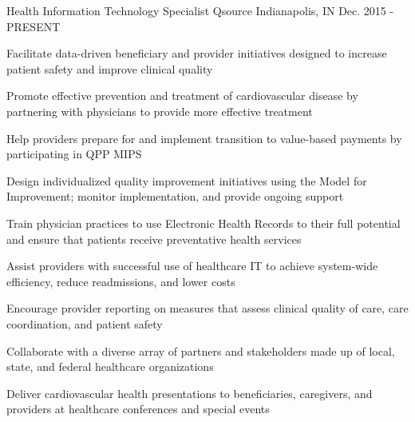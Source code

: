 \begin{cventries}
  \cventry
    {Health Information Technology Specialist} %
    {Qsource} %
    {Indianapolis, IN} %
    {Dec. 2015 - PRESENT} %
    {
      \begin{cvitems} %
      \item {Facilitate data-driven beneficiary and provider initiatives designed to increase patient safety and improve clinical quality}
      \item {Promote effective prevention and treatment of cardiovascular disease by partnering with physicians to provide more effective treatment}
        \item {Help providers prepare for and implement transition to value-based payments by participating in QPP MIPS}
    \item {Design individualized quality improvement initiatives using the Model for Improvement; monitor implementation, and provide ongoing support}
    \item {Train physician practices to use Electronic Health Records to their full potential and ensure that patients receive preventative health services}
    \item {Assist providers with successful use of healthcare IT to achieve system-wide efficiency, reduce readmissions, and lower costs}
    \item {Encourage provider reporting on measures that assess clinical quality of care, care coordination, and patient safety}
    \item {Collaborate with a diverse array of partners and stakeholders made up of local, state, and federal healthcare organizations}
    \item {Deliver cardiovascular health presentations to beneficiaries, caregivers, and providers at healthcare conferences and special events}
  \end{cvitems}
    }


\end{cventries}
